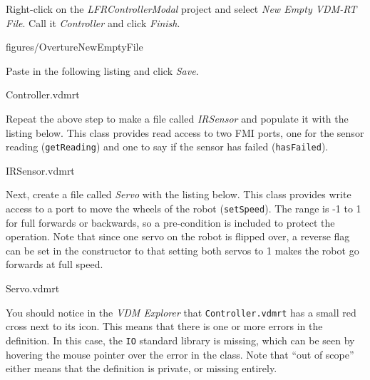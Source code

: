 \documentclass[11pt,a4paper]{../tutorial}
\begin{document}
\begin{instructions}
\item Right-click on the \emph{LFRControllerModal} project and select \emph{New \menusep{} Empty VDM-RT File}. Call it \emph{Controller} and click \emph{Finish}.

    \begin{annotation}[width=0.99\linewidth,trim=0 300 0 0,clip]{figures/OvertureNewEmptyFile}
    \end{annotation}

\item Paste in the following listing and click \emph{Save}.

    \bigskip
    
    {Controller.vdmrt}


\newpage
\item Repeat the above step to make a file called \emph{IRSensor} and populate it with the listing below. This class provides read access to two FMI ports, one for the sensor reading (\texttt{getReading}) and one to say if the sensor has failed (\texttt{hasFailed}).

    \bigskip
    
    {IRSensor.vdmrt}

\item Next, create a file called \emph{Servo} with the listing below. This class provides write access to a port to move the wheels of the robot (\texttt{setSpeed}). The range is -1 to 1 for full forwards or backwards, so a pre-condition is included to protect the operation. Note that since one servo on the robot is flipped over, a reverse flag can be set in the constructor to that setting both servos to 1 makes the robot go forwards at full speed.

    \bigskip
    
    {Servo.vdmrt}

\item You should notice in the \emph{VDM Explorer} that \texttt{Controller.vdmrt} has a small red cross next to its icon. This means that there is one or more errors in the definition. In this case, the \texttt{IO} standard library is missing, which can be seen by hovering the mouse pointer over the error in the class. Note that ``out of scope'' either means that the definition is private, or missing entirely.


\end{instructions}
\end{document}
